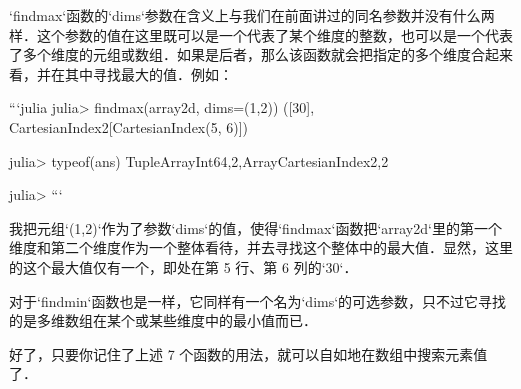 `findmax`函数的`dims`参数在含义上与我们在前面讲过的同名参数并没有什么两样．这个参数的值在这里既可以是一个代表了某个维度的整数，也可以是一个代表了多个维度的元组或数组．如果是后者，那么该函数就会把指定的多个维度合起来看，并在其中寻找最大的值．例如：

```julia
julia> findmax(array2d, dims=(1,2))
([30], CartesianIndex{2}[CartesianIndex(5, 6)])

julia> typeof(ans)
Tuple{Array{Int64,2},Array{CartesianIndex{2},2}}

julia> 
```

我把元组`(1,2)`作为了参数`dims`的值，使得`findmax`函数把`array2d`里的第一个维度和第二个维度作为一个整体看待，并去寻找这个整体中的最大值．显然，这里的这个最大值仅有一个，即处在第 5 行、第 6 列的`30`．

对于`findmin`函数也是一样，它同样有一个名为`dims`的可选参数，只不过它寻找的是多维数组在某个或某些维度中的最小值而已．

好了，只要你记住了上述 7 个函数的用法，就可以自如地在数组中搜索元素值了．